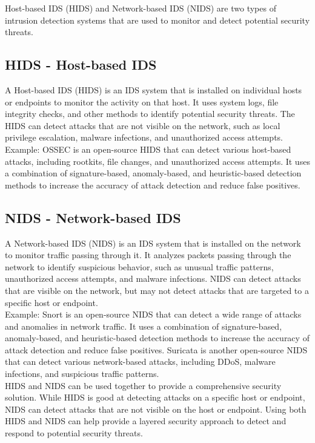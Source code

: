 \documentclass[openany]{book}
\begin{document}
Host-based IDS (HIDS) and Network-based IDS (NIDS) are two types of intrusion detection systems that are used to monitor and detect potential security threats.

\subsection{HIDS - Host-based IDS}

A Host-based IDS (HIDS) is an IDS system that is installed on individual hosts or endpoints to monitor the activity on that host. It uses system logs, file integrity checks, and other methods to identify potential security threats. The HIDS can detect attacks that are not visible on the network, such as local privilege escalation, malware infections, and unauthorized access attempts.\\

Example: OSSEC is an open-source HIDS that can detect various host-based attacks, including rootkits, file changes, and unauthorized access attempts. It uses a combination of signature-based, anomaly-based, and heuristic-based detection methods to increase the accuracy of attack detection and reduce false positives.

\subsection{NIDS - Network-based IDS}

A Network-based IDS (NIDS) is an IDS system that is installed on the network to monitor traffic passing through it. It analyzes packets passing through the network to identify suspicious behavior, such as unusual traffic patterns, unauthorized access attempts, and malware infections. NIDS can detect attacks that are visible on the network, but may not detect attacks that are targeted to a specific host or endpoint.\\

Example: Snort is an open-source NIDS that can detect a wide range of attacks and anomalies in network traffic. It uses a combination of signature-based, anomaly-based, and heuristic-based detection methods to increase the accuracy of attack detection and reduce false positives. Suricata is another open-source NIDS that can detect various network-based attacks, including DDoS, malware infections, and suspicious traffic patterns.\\

HIDS and NIDS can be used together to provide a comprehensive security solution. While HIDS is good at detecting attacks on a specific host or endpoint, NIDS can detect attacks that are not visible on the host or endpoint. Using both HIDS and NIDS can help provide a layered security approach to detect and respond to potential security threats.
\end{document}
